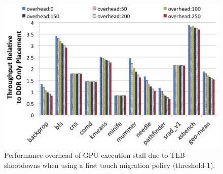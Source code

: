 \begin{figure}[t]
    \includegraphics[width=\columnwidth]{hpca2015/figures/migrationoverheads.png} 
    \caption{Performance overhead of GPU execution stall due to TLB shootdowns when using a first touch migration policy (threshold-1).}
    \label{fig:migrationoverheads}
\end{figure}

